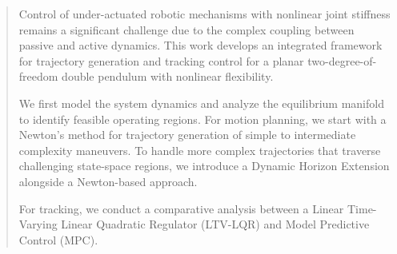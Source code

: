 \begin{abstract}

Control of under-actuated robotic mechanisms with nonlinear joint stiffness remains 
a significant challenge due to the complex coupling between passive and active dynamics. 
This work develops an integrated framework for trajectory generation and tracking control 
for a planar two-degree-of-freedom double pendulum with nonlinear flexibility.

We first model the system dynamics and analyze the equilibrium manifold to identify feasible operating regions.
For motion planning, we start with a Newton's method for trajectory generation of simple to intermediate complexity maneuvers. 
To handle more complex trajectories that traverse challenging state-space regions, we introduce a Dynamic Horizon Extension alongside a Newton-based approach.

For tracking, we conduct a comparative analysis between a Linear Time-Varying Linear Quadratic Regulator (LTV-LQR) and Model Predictive Control (MPC). 

\end{abstract}

\newpage


